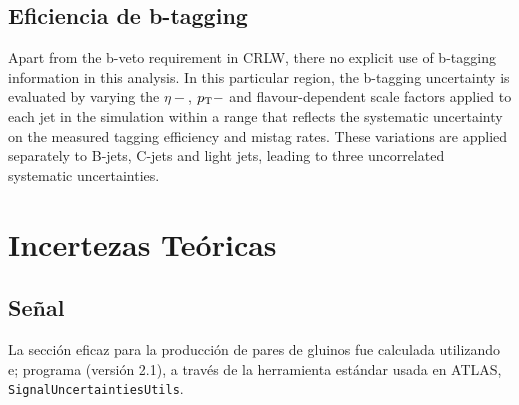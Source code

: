\subsection{Eficiencia de b-tagging}
Apart from the b-veto requirement in CRLW, there no explicit use of b-tagging information in this analysis.
In this particular region, the b-tagging uncertainty is evaluated by varying the $\eta-$, $p_{\mathrm{T}}-$ and flavour-dependent
scale factors applied to each jet in the simulation within a range that reflects the systematic uncertainty
on the measured tagging efficiency and mistag rates. These variations are applied separately to B-jets,
C-jets and light jets, leading to three uncorrelated systematic uncertainties.

\section{Incertezas Teóricas}\label{sec:theosyst}

\subsection{Señal}\label{sec:syst_signal}

La sección eficaz para la producción de pares de gluinos  fue calculada utilizando
e; programa {\nllfast} (versión 2.1)\cite{nllfast}, a través de la herramienta
estándar usada en ATLAS, \texttt{SignalUncertaintiesUtils}.




